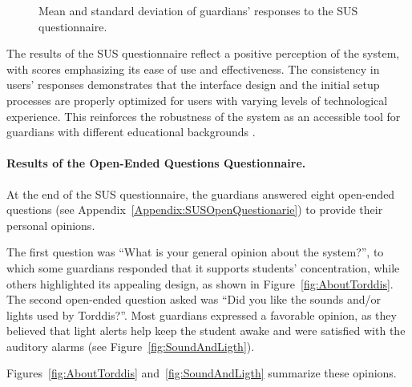 \begin{figure}[!htbp]
                    \caption{Mean and standard deviation of guardians' responses to the SUS questionnaire.}
                    \label{fig:sus-questionnaire}
                \end{figure}
                
                The results of the SUS questionnaire \citep{Brooke1996SUS} reflect a positive perception of the system, with scores emphasizing its ease of use and effectiveness. The consistency in users' responses demonstrates that the interface design and the initial setup processes are properly optimized for users with varying levels of technological experience. This reinforces the robustness of the system as an accessible tool for guardians with different educational backgrounds \citep{Deng2024Does}.
                
                \paragraph{Results of the Open-Ended Questions Questionnaire.}
                At the end of the SUS questionnaire, the guardians answered eight open-ended questions (see Appendix~\ref{Appendix:SUSOpenQuestionarie}) to provide their personal opinions.
                
                The first question was “What is your general opinion about the system?”, to which some guardians responded that it supports students' concentration, while others highlighted its appealing design, as shown in Figure~\ref{fig:AboutTorddis}. The second open-ended question asked was “Did you like the sounds and/or lights used by Torddis?”. Most guardians expressed a favorable opinion, as they believed that light alerts help keep the student awake and were satisfied with the auditory alarms (see Figure~\ref{fig:SoundAndLigth}).
                
                Figures~\ref{fig:AboutTorddis} and~\ref{fig:SoundAndLigth} summarize these opinions.
                
